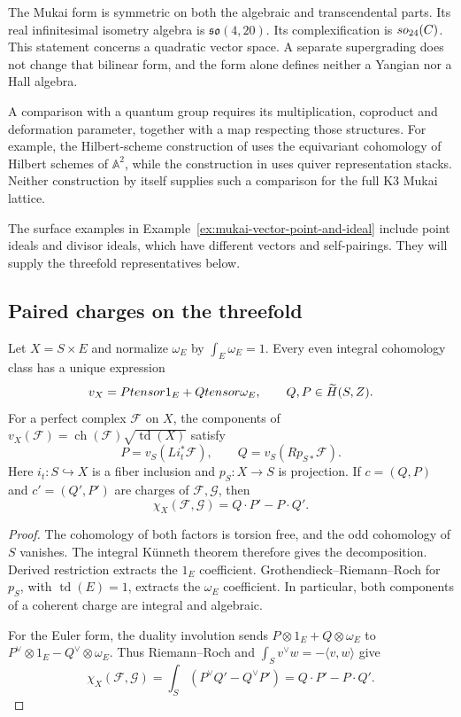 \begin{remark}
\label{rem:mukai-symmetric-both-parts}
The Mukai form is symmetric on both the algebraic and transcendental
parts.  Its real infinitesimal isometry algebra is
$\mathfrak{so}(4,20)$.  Its complexification is
$so_{24}(C)$.  This statement concerns a quadratic vector
space.  A separate supergrading does not change that bilinear form,
and the form alone defines neither a Yangian nor a Hall algebra.

A comparison with a quantum group requires its multiplication,
coproduct and deformation parameter, together with a map respecting
those structures.  For example, the Hilbert-scheme construction of
\cite[\S2]{SchiffmannVasserot2013} uses the equivariant cohomology of
Hilbert schemes of $\mathbb A^2$, while the construction in
\cite[\S2]{KSCoHA} uses quiver representation stacks.  Neither
construction by itself supplies such a comparison for the full K3
Mukai lattice.
\end{remark}

The surface examples in Example~\ref{ex:mukai-vector-point-and-ideal}
include point ideals and divisor ideals, which have different vectors
and self-pairings.  They will supply the threefold representatives
below.

\subsection{Paired charges on the threefold}
\label{subsec:kunneth-k3-times-e-appendixC}

\begin{proposition}
\label{prop:kunneth-k3-times-e-appendixC}
Let $X=S\times E$ and normalize $\omega_E$ by $\int_E\omega_E=1$.
Every even integral cohomology class has a unique expression
\[
v_X=Ptensor1_E+Qtensor\omega_E,
\qquad Q,P\in\widetilde H(S,Z).
\]
For a perfect complex $\mathcal F$ on $X$, the components of
$v_X(\mathcal F)=\operatorname{ch}(\mathcal F)
\sqrt{\operatorname{td}(X)}$ satisfy
\[
P=v_S(Li_t^*\mathcal F),\qquad
Q=v_S(Rp_{S*}\mathcal F).
\]
Here $i_t:S\hookrightarrow X$ is a fiber inclusion and
$p_S:X\to S$ is projection.  If $c=(Q,P)$ and $c'=(Q',P')$ are
charges of $\mathcal F,\mathcal G$, then
\[
\chi_X(\mathcal F,\mathcal G)=Q\cdot P'-P\cdot Q'.
\]
\end{proposition}

\begin{proof}
The cohomology of both factors is torsion free, and the odd
cohomology of $S$ vanishes.  The integral K\"unneth theorem therefore
gives the decomposition.  Derived restriction extracts the
$1_E$ coefficient.  Grothendieck--Riemann--Roch for $p_S$, with
$\operatorname{td}(E)=1$, extracts the $\omega_E$ coefficient.
In particular, both components of a coherent charge are integral
and algebraic.

For the Euler form, the duality involution sends
$P\otimes1_E+Q\otimes\omega_E$ to
$P^\vee\otimes1_E-Q^\vee\otimes\omega_E$.  Thus Riemann--Roch
and $\int_S v^\vee w=-\langle v,w\rangle$ give
\[
\chi_X(\mathcal F,\mathcal G)
=\int_S(P^\vee Q'-Q^\vee P')=Q\cdot P'-P\cdot Q'.
\]
\end{proof}


